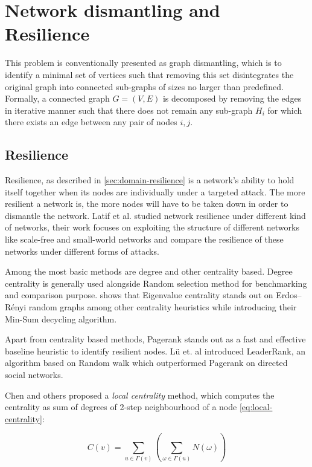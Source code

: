 	\section{Network dismantling and Resilience}
	\label{sec:related-work-resilience}
	This problem is conventionally presented as graph dismantling, which is to identify a minimal set of vertices such that removing this set disintegrates the original graph into connected sub-graphs of sizes no larger than predefined. Formally, a connected graph $G=(V,E)$ is decomposed by removing the edges in iterative manner such that there does not remain any sub-graph $H_i$ for which there exists an edge between any pair of nodes $i,j$.

		\subsection{Resilience}
		\label{subsec:related-work-resilience}
		Resilience, as described in \ref{sec:domain-resilience} is a network's ability to hold itself together when its nodes are individually under a targeted attack. The more resilient a network is, the more nodes will have to be taken down in order to dismantle the network. Latif et al. \cite{latif2014} studied network resilience under different kind of networks, their work focuses on exploiting the structure of different networks like scale-free and small-world networks and compare the resilience of these networks under different forms of attacks.
		
		Among the most basic methods are degree and other centrality based. Degree centrality is generally used alongside Random selection method for benchmarking and comparison purpose. \cite{braunstein2016} shows that Eigenvalue centrality stands out on Erdos–Rényi random graphs among other centrality heuristics while introducing their Min-Sum decycling algorithm.
		
		Apart from centrality based methods, Pagerank \cite{pagerank1999} stands out as a fast and effective baseline heuristic to identify resilient nodes. Lü et. al \cite{lu2011} introduced LeaderRank, an algorithm based on Random walk which outperformed Pagerank on directed social networks.
		
		Chen \cite{chen2012b} and others proposed a \textit{local centrality} method, which computes the centrality as sum of degrees of 2-step neighbourhood of a node \ref{eq:local-centrality}:
		
		\begin{equation}
			\label{eq:local-centrality}
			C(v)=\sum_{u\in\Gamma(v)}(\sum_{\omega\in\Gamma(u)}N(\omega))
		\end{equation}
		
